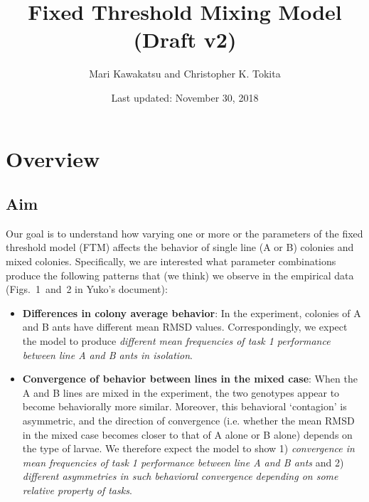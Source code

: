 \documentclass[11pt]{article}
\title{Fixed Threshold Mixing Model ({\color{red}Draft v2})}
\author{Mari Kawakatsu and Christopher K. Tokita}
\date{Last updated: November 30, 2018}
\begin{document}
\maketitle
\tableofcontents

\newpage
\section{Overview}

\subsection{Aim}\label{sec:aim}
Our goal is to understand how varying one or more or the parameters of the fixed threshold model (FTM) affects the behavior of single line (A or B) colonies and mixed colonies. Specifically, we are interested what parameter combinations produce the following patterns that (we think) we observe in the empirical data (Figs.~1~and~2 in Yuko's document):

\begin{itemize}
    \item \textbf{Differences in colony average behavior}: 
    In the experiment, colonies of A and B ants have different mean RMSD values. Correspondingly, we expect the model to produce \textit{different mean frequencies of task 1 performance between line A and B ants in isolation}.

    \item \textbf{Convergence of behavior between lines in the mixed case}:
    When the A and B lines are mixed in the experiment, the two genotypes appear to become behaviorally more similar. Moreover, this behavioral `contagion' is asymmetric, and the direction of convergence (i.e. whether the mean RMSD in the mixed case becomes closer to that of A alone or B alone) depends on the type of larvae. We therefore expect the model to show 1) \textit{convergence in mean frequencies of task 1 performance between line A and B ants} and 2) \textit{different asymmetries in such behavioral convergence depending on some relative property of tasks}.
    
\end{itemize}

\end{document}
